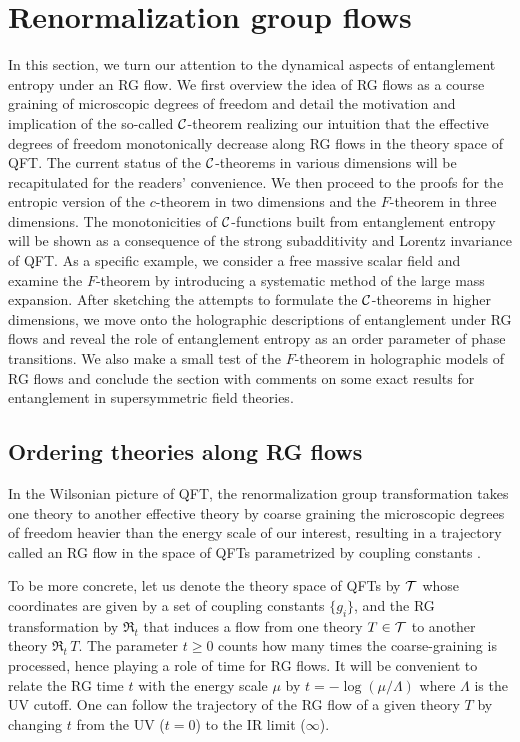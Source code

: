 \section{Renormalization group flows}\label{ss:RGflow}

In this section, we turn our attention to the dynamical aspects of entanglement entropy under an RG flow.
We first overview the idea of RG flows as a course graining of microscopic degrees of freedom and detail the motivation and implication of the so-called ${\cal C}$-theorem realizing our intuition that the effective degrees of freedom monotonically decrease along RG flows in the theory space of QFT.
The current status of the ${\cal C}$-theorems in various dimensions will be recapitulated for the readers' convenience.
We then proceed to the proofs for the entropic version of the $c$-theorem in two dimensions and the $F$-theorem in three dimensions.
The monotonicities of ${\cal C}$-functions built from entanglement entropy will be shown as a consequence of the strong subadditivity and Lorentz invariance of QFT.
As a specific example, we consider a free massive scalar field and examine the $F$-theorem by introducing a systematic method of the large mass expansion.
After sketching the attempts to formulate the ${\cal C}$-theorems in higher dimensions, we move onto the holographic descriptions of entanglement under RG flows and reveal the role of entanglement entropy as an order parameter of phase transitions.
We also make a small test of the $F$-theorem in holographic models of RG flows and conclude the section with comments on some exact results for entanglement in supersymmetric field theories.


\subsection{Ordering theories along RG flows}\label{ss:OrderingRG}
In the Wilsonian picture of QFT, the renormalization group transformation takes one theory  to another effective theory by coarse graining the microscopic degrees of freedom heavier than the energy scale of our interest, resulting in a trajectory called an RG flow in the space of QFTs parametrized by coupling constants \cite{Wilson:1973jj,Polchinski:1983gv}.

To be more concrete, let us denote the theory space of QFTs by ${\cal T}$ whose coordinates are given by a set of coupling constants $\{ g_i\}$, and the RG transformation by $\mathfrak{R}_t$ that induces a flow from one theory $T \in{\cal T}$ to another theory $\mathfrak{R}_t\, T$.
The parameter $t \ge 0$ counts how many times the coarse-graining is processed, hence playing a role of time for RG flows.
It will be convenient to relate the RG time $t$ with the energy scale $\mu$ by $t = - \log (\mu/\Lambda)$ where $\Lambda$ is the UV cutoff.
One can follow the trajectory of the RG flow of a given theory $T$ by changing $t$ from the UV ($t=0$) to the IR limit ($\infty$).

